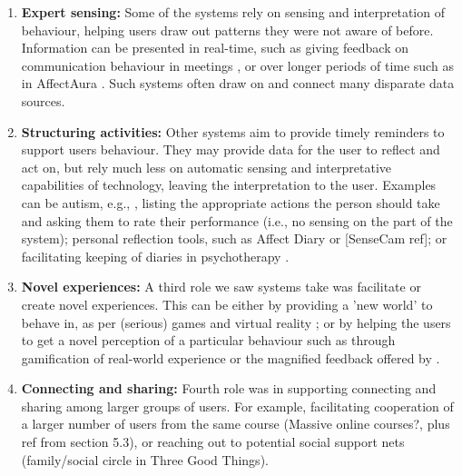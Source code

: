 \documentclass[prodmode,acmtochi]{acmsmall}
\newcommand{\todo}[1]{\textrm{\textrm{\textcolor{LightBlue}{[[#1]]} } } }
\begin{document}
        \begin{enumerate}
                \item {\bf Expert sensing:} Some of the systems rely on sensing and interpretation of behaviour, helping users draw out patterns they were not aware of before. Information can be presented in real-time, such as giving feedback on communication behaviour in meetings \cite{Kim2008,DiMicco2007}, or over longer periods of time such as in AffectAura \cite{McDuff2012}. Such systems often draw on and connect many disparate data sources. 
                


                \item {\bf Structuring activities:} Other systems aim to provide timely reminders to support users behaviour. They may provide data for the user to reflect and act on, but rely much less on automatic sensing and interpretative capabilities of technology, leaving the  interpretation to the user. Examples can be autism, e.g., \cite{Escobedo2012}, listing the appropriate actions the person should take and asking them to rate their performance (i.e., no sensing on the part of the system); personal reflection tools, such as Affect Diary \cite{Stahl2008} or [SenseCam ref]; or facilitating keeping of diaries in psychotherapy \cite{Matthews2011}.  

                \item {\bf Novel experiences:} A third role we saw systems take was facilitate or create novel experiences. This can be either by providing a 'new world' to behave in,  as per (serious) games \cite{Hailpern2011} and virtual reality \cite{Bouchard2012,Romano2005};  or by helping the users to get a novel perception of a particular behaviour such as through gamification of real-world experience or the magnified feedback offered by . 

                \item {\bf Connecting and sharing:} Fourth role was in supporting connecting and sharing among larger groups of users. For example, facilitating cooperation of a larger number of users from the same course (Massive online courses?, plus ref from section 5.3), or reaching out to potential social support nets (family/social circle in Three Good Things). 
        \end{enumerate}
\end{document}
